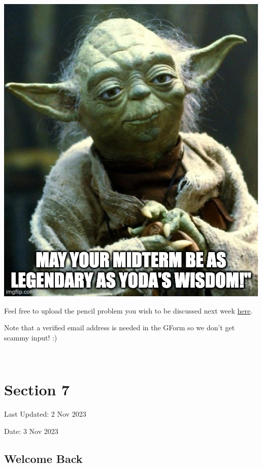 \documentclass[
  letterpaper,
  DIV=11,
  numbers=noendperiod]{scrreprt}
\theoremstyle{definition}
\theoremstyle{plain}
\theoremstyle{remark}
\begin{document}
\includegraphics{./assets/img/gluck.jpeg}

Feel free to upload the pencil problem you wish to be discussed next
week \href{https://forms.gle/RBmMNYJp4u3qD5W79}{here}.

Note that a verified email address is needed in the GForm so we don't
get scammy input! :)

\(\,\)


\hypertarget{section-7}{%
\chapter*{Section 7}\label{section-7}}


Last Updated: 2 Nov 2023

Date: 3 Nov 2023

\hypertarget{welcome-back}{%
\section*{Welcome Back}\label{welcome-back}}
\end{document}
